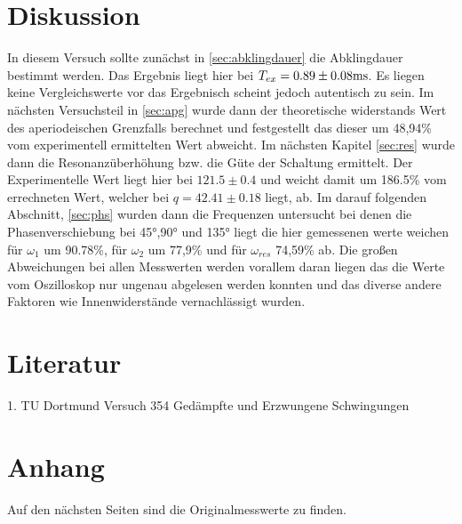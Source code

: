 \section{Diskussion}
In diesem Versuch sollte zunächst in \autoref{sec:abklingdauer} die Abklingdauer bestimmt 
werden. Das Ergebnis liegt hier bei $T_{ex} = 0.89\pm 0.08 \si[]{ms}$.
Es liegen keine Vergleichswerte vor das Ergebnisch scheint jedoch autentisch zu 
sein. Im nächsten Versuchsteil in \autoref{sec:apg} wurde dann der theoretische
widerstands Wert des aperiodeischen Grenzfalls berechnet und festgestellt das dieser
um 48,94\% vom experimentell ermittelten Wert abweicht. Im nächsten Kapitel
\autoref{sec:res} wurde dann die Resonanzüberhöhung bzw. die Güte der Schaltung ermittelt.
Der Experimentelle Wert liegt hier bei $121.5\pm 0.4$ und weicht damit um 186.5\% vom 
errechneten Wert, welcher bei $q=42.41\pm 0.18$ liegt, ab. Im darauf folgenden 
Abschnitt, \autoref{sec:phs} wurden dann die Frequenzen untersucht bei denen 
die Phasenverschiebung bei 45°,90° und 135° liegt die hier gemessenen werte weichen für
$\omega_1$ um 90.78\%, für $\omega_2$ um 77,9\% und für $\omega_{res}$ 74,59\% ab. 
Die großen Abweichungen bei allen Messwerten werden vorallem daran liegen das 
die Werte vom Oszilloskop nur ungenau abgelesen werden konnten und das diverse andere
Faktoren wie Innenwiderstände vernachlässigt wurden.

\section{Literatur}
1. TU Dortmund Versuch 354 Gedämpfte und Erzwungene Schwingungen\\

\section{Anhang}
Auf den nächsten Seiten sind die Originalmesswerte zu finden.